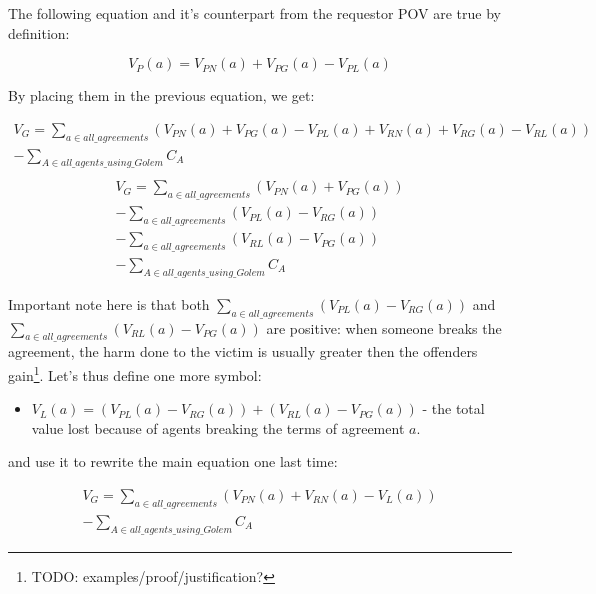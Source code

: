 \documentclass{article}
\begin{document}
The following equation and it's counterpart from the requestor POV are true by definition:

\begin{equation}
    V_P(a) = V_{PN}(a) + V_{PG}(a) - V_{PL}(a)
\end{equation}

By placing them in the previous equation, we get:

\begin{equation}
\begin{split}
    V_G = \sum_{a \in all\_agreements}(V_{PN}(a) + V_{PG}(a) - V_{PL}(a) + V_{RN}(a) + V_{RG}(a) - V_{RL}(a)) \\
            - \sum_{A \in all\_agents\_using\_Golem}C_A \\
\end{split}
\end{equation}
\begin{equation}
\begin{split}
    V_G = \sum_{a \in all\_agreements}(V_{PN}(a) + V_{PG}(a)) \\
          - \sum_{a \in all\_agreements}(V_{PL}(a)- V_{RG}(a)) \\
          - \sum_{a \in all\_agreements}(V_{RL}(a)- V_{PG}(a)) \\
          - \sum_{A \in all\_agents\_using\_Golem}C_A
\end{split}
\end{equation}

Important note here is that both $\sum_{a \in all\_agreements}(V_{PL}(a)- V_{RG}(a))$ and $\sum_{a \in all\_agreements}(V_{RL}(a)- V_{PG}(a))$ are positive: 
when someone breaks the agreement, the harm done to the victim is usually greater then the offenders gain\footnote{TODO: examples/proof/justification?}.
Let's thus define one more symbol:
\begin{itemize}
\item $V_L(a) = (V_{PL}(a)- V_{RG}(a)) + (V_{RL}(a)- V_{PG}(a))$ - the total value lost because of agents breaking the terms of agreement $a$.
\end{itemize}
and use it to rewrite the main equation one last time:

\begin{equation}
\begin{split}
    V_G = \sum_{a \in all\_agreements}(V_{PN}(a) + V_{RN}(a) - V_L(a)) \\
          - \sum_{A \in all\_agents\_using\_Golem}C_A
\end{split}
\end{equation}
\end{document}
